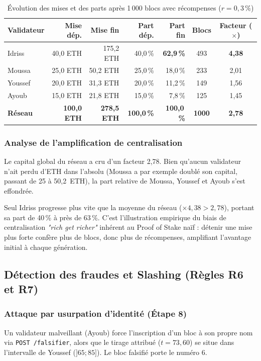 \documentclass[11pt,a4paper]{article}
\begin{document}
\begin{table}[H]
\centering
\small
\begin{tabular}{@{}lrrrrcc@{}}
\toprule
\textbf{Validateur} & \textbf{Mise dép.} & \textbf{Mise fin} & \textbf{Part dép.} & \textbf{Part fin} & \textbf{Blocs} & \textbf{Facteur ($\times$)} \\
\midrule
Idriss  &  40,0 ETH & 175,2 ETH & 40,0\,\% & \textbf{62,9\,\%} & 493 & \textbf{4,38} \\
Moussa  &  25,0 ETH &  50,2 ETH & 25,0\,\% & 18,0\,\%          & 233 & 2,01 \\
Youssef &  20,0 ETH &  31,3 ETH & 20,0\,\% & 11,2\,\%          & 149 & 1,56 \\
Ayoub   &  15,0 ETH &  21,8 ETH & 15,0\,\% &  7,8\,\%          & 125 & 1,45 \\
\midrule
\textbf{Réseau} & \textbf{100,0 ETH} & \textbf{278,5 ETH} & \textbf{100,0\,\%} & \textbf{100,0\,\%} & \textbf{1000} & \textbf{2,78} \\
\bottomrule
\end{tabular}
\caption{Évolution des mises et des parts après 1\,000 blocs avec récompenses ($r = 0{,}3\,\%$)}
\label{tab:recompenses}
\end{table}

\subsubsection*{Analyse de l'amplification de centralisation}
Le capital global du réseau a cru d'un facteur 2,78. Bien qu'aucun validateur n'ait perdu d'ETH dans l'absolu (Moussa a par exemple doublé son capital, passant de 25 à 50,2~ETH), la part relative de Moussa, Youssef et Ayoub s'est effondrée. 

Seul Idriss progresse plus vite que la moyenne du réseau ($\times 4{,}38 > 2{,}78$), portant sa part de 40\,\% à près de 63\,\%. C'est l'illustration empirique du biais de centralisation \emph{"rich get richer"} inhérent au Proof of Stake naïf : détenir une mise plus forte confère plus de blocs, donc plus de récompenses, amplifiant l'avantage initial à chaque génération.

\subsection{Détection des fraudes et Slashing (Règles R6 et R7)}

\subsubsection*{Attaque par usurpation d'identité (Étape 8)}
Un validateur malveillant (Ayoub) force l'inscription d'un bloc à son propre nom via \texttt{POST /falsifier}, alors que le tirage attribué ($t = 73{,}60$) se situe dans l'intervalle de Youssef ($]65 ; 85]$). Le bloc falsifié porte le numéro 6.
\end{document}

